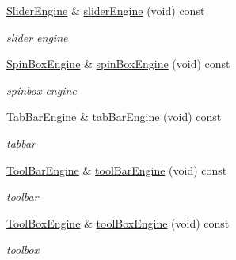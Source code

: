 \begin{DoxyCompactItemize}
\mbox{\label{class_animations_ae3a4f912cf0eadd8bc5a03c44b771714}} 
\hyperlink{class_slider_engine}{Slider\+Engine} \& \hyperlink{class_animations_ae3a4f912cf0eadd8bc5a03c44b771714}{slider\+Engine} (void) const
\begin{DoxyCompactList}\small\item\em slider engine \end{DoxyCompactList}\item 
\mbox{\label{class_animations_ab04d3868d28fa37f3f5e6f315446c6b3}} 
\hyperlink{class_spin_box_engine}{Spin\+Box\+Engine} \& \hyperlink{class_animations_ab04d3868d28fa37f3f5e6f315446c6b3}{spin\+Box\+Engine} (void) const
\begin{DoxyCompactList}\small\item\em spinbox engine \end{DoxyCompactList}\item 
\mbox{\label{class_animations_a977db58bd62adba6aa9428a77d35a5ff}} 
\hyperlink{class_tab_bar_engine}{Tab\+Bar\+Engine} \& \hyperlink{class_animations_a977db58bd62adba6aa9428a77d35a5ff}{tab\+Bar\+Engine} (void) const
\begin{DoxyCompactList}\small\item\em tabbar \end{DoxyCompactList}\item 
\mbox{\label{class_animations_aa9b85e833dec563387fd7593dba1fcbf}} 
\hyperlink{class_tool_bar_engine}{Tool\+Bar\+Engine} \& \hyperlink{class_animations_aa9b85e833dec563387fd7593dba1fcbf}{tool\+Bar\+Engine} (void) const
\begin{DoxyCompactList}\small\item\em toolbar \end{DoxyCompactList}\item 
\mbox{\label{class_animations_a1c1c2f04bc7ef3817d232d3bcfd84021}} 
\hyperlink{class_tool_box_engine}{Tool\+Box\+Engine} \& \hyperlink{class_animations_a1c1c2f04bc7ef3817d232d3bcfd84021}{tool\+Box\+Engine} (void) const
\begin{DoxyCompactList}\small\item\em toolbox \end{DoxyCompactList}\item 
\mbox{\label{class_animations_a9e8d4b2326923adc9af5a8068cbf17b7}} 

\end{DoxyCompactItemize}
